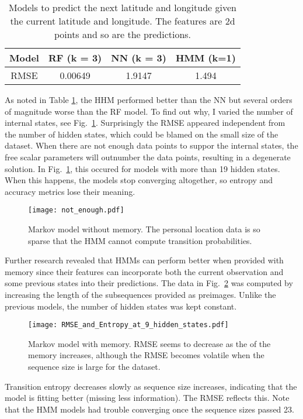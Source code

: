 \documentclass[11pt]{amsart}
\begin{document}
\begin{table}[h!]
\centering
\begin{tabular}{|c|c|c|c|}
\hline
Model & RF (k = 3) & NN (k = 3) & HMM (k=1) \\ \hline
RMSE & 0.00649 & 1.9147 & 1.494\\ \hline
\end{tabular}
\caption{Models to predict the next latitude and longitude given the current latitude and longitude.
The features are 2d points and so are the predictions.}
\label{table2}
\end{table}

As noted in Table \ref{table2}, the HHM performed better than the NN but several orders of magnitude worse than the RF model.
To find out why, I varied the number of internal states, see Fig.~\ref{fig:rmse_entropy}.
Surprisingly the RMSE appeared independent from the number of hidden states, which could be blamed on the small size of the dataset.
When there are not enough data points to suppor the internal states, the free scalar parameters will outnumber the data points, resulting in a degenerate solution.
In Fig.~\ref{fig:rmse_entropy}, this occured for models with more than 19 hidden states.
When this happens, the models stop converging altogether, so entropy and accuracy metrics lose their meaning.

\begin{figure}[h!]
    \centering
    \texttt{[image: not\_enough.pdf]} %
    \caption{Markov model without memory.
    The personal location data is so sparse that the HMM cannot compute transition probabilities.}
    \label{fig:rmse_entropy}
\end{figure}

Further research revealed that HMMs can perform better when provided with memory since their features can incorporate both the current observation and some previous states into their predictions.
The data in Fig.~\ref{fig:hmm_memory} was computed by increasing the length of the subsequences provided as preimages.
Unlike the previous models, the number of hidden states was kept constant.
\begin{figure}[h!]
    \centering
    \texttt{[image: RMSE\_and\_Entropy\_at\_9\_hidden\_states.pdf]} %
    \caption{Markov model with memory.
    RMSE seems to decrease as the of the memory increases, although the RMSE becomes volatile when the sequence size is large for the dataset.}
    \label{fig:hmm_memory}
\end{figure}
Transition entropy decreases slowly as sequence size increases, indicating that the model is fitting better (missing less information).
The RMSE reflects this.
Note that the HMM models had trouble converging once the sequence sizes passed 23.
\end{document}
